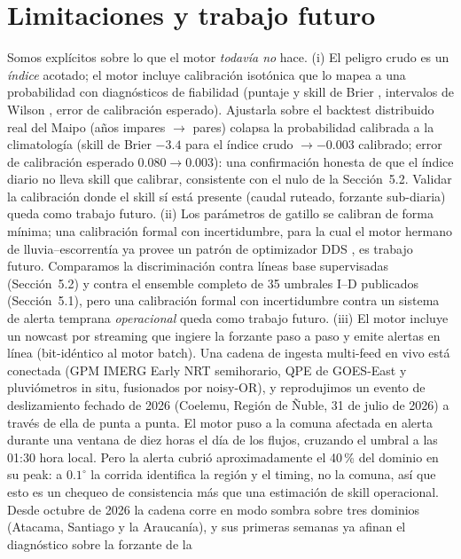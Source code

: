 \documentclass[authoryear,preprint,review,12pt]{elsarticle}
\begin{document}
\section{Limitaciones y trabajo futuro}
\label{sec:limits}

Somos explícitos sobre lo que el motor \emph{todavía no} hace. (i) El peligro
crudo es un \emph{índice} acotado; el motor incluye calibración isotónica
\citep{niculescumizil2005} que lo mapea a una probabilidad con diagnósticos de
fiabilidad (puntaje y skill de Brier \citep{brier1950}, intervalos de Wilson
\citep{wilson1927}, error de calibración esperado). Ajustarla sobre el backtest
distribuido real del Maipo (años impares $\to$ pares) colapsa la probabilidad
calibrada a la climatología (skill de Brier $-3.4$ para el índice crudo $\to
-0.003$ calibrado; error de calibración esperado $0.080\to0.003$): una confirmación
honesta de que el índice diario no lleva skill que calibrar, consistente con el
nulo de la Sección~5.2. Validar la calibración donde el skill sí está presente (caudal
ruteado, forzante sub-diaria) queda como trabajo futuro. (ii) Los
parámetros de gatillo se calibran de forma mínima; una calibración formal con
incertidumbre, para la cual el motor hermano de lluvia--escorrentía ya provee un
patrón de optimizador DDS \citep{tolson2007}, es trabajo futuro. Comparamos la
discriminación contra líneas base supervisadas (Sección~5.2) y contra el ensemble
completo de 35 umbrales I--D publicados (Sección~5.1), pero una calibración formal
con incertidumbre contra un sistema de alerta temprana \emph{operacional} queda
como trabajo futuro. (iii) El motor incluye un nowcast por streaming que ingiere la
forzante paso a paso y emite alertas en línea (bit-idéntico al motor batch). Una
cadena de ingesta multi-feed en vivo está conectada (GPM IMERG Early NRT
semihorario, QPE de GOES-East y pluviómetros in situ, fusionados por noisy-OR), y
reprodujimos un evento de deslizamiento fechado de 2026 (Coelemu, Región de Ñuble, 31 de julio de 2026) a través de ella de punta a
punta. El motor puso a la comuna afectada en alerta durante una ventana de diez
horas el día de los flujos, cruzando el umbral a las 01:30 hora local. Pero la
alerta cubrió aproximadamente el 40\,\% del dominio en su peak: a $0.1^{\circ}$ la
corrida identifica la región y el timing, no la comuna, así que esto es un chequeo
de consistencia más que una estimación de skill operacional. Desde octubre de 2026
la cadena corre en modo sombra sobre tres dominios (Atacama, Santiago y la
Araucanía), y sus primeras semanas ya afinan el diagnóstico sobre la forzante de la
\end{document}
